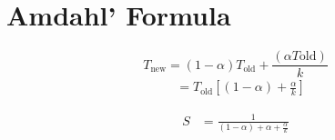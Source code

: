 \documentclass{article}
\author{CSS APP}
\begin{document}
\section*{Amdahl' Formula}

\begin{equation*}
    T_{\text{new}}= (1 - \alpha)T_{\text{old}} + \frac{(\alpha T{\text{old}}) }{k}
\end{equation*}
    \begin{align*}
        &= T_{\text{old}}[(1 - \alpha) + \frac{\alpha}{k}]
    \end{align*}

    \begin{align*}
        S &= \frac{1}{(1 - \alpha) + \alpha + \frac{\alpha}{k}}
    \end{align*}
\end{document}

